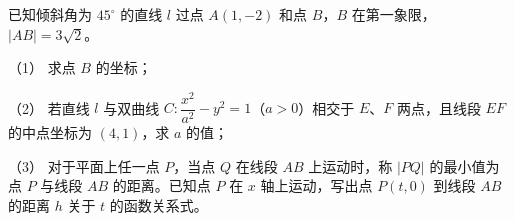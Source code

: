 \begin{question}
已知倾斜角为 $45^\circ$ 的直线 $l$ 过点 $A(1,-2)$ 和点 $B$，$B$ 在第一象限，$|AB|=3\sqrt{2}$。

（1） 求点 $B$ 的坐标；

（2） 若直线 $l$ 与双曲线 $C:\dfrac{x^2}{a^2}-y^2=1$（$a>0$）相交于 $E$、$F$ 两点，且线段 $EF$ 的中点坐标为 $(4,1)$，求 $a$ 的值；

（3） 对于平面上任一点 $P$，当点 $Q$ 在线段 $AB$ 上运动时，称 $|PQ|$ 的最小值为点 $P$ 与线段 $AB$ 的距离。已知点 $P$ 在 $x$ 轴上运动，写出点 $P(t,0)$ 到线段 $AB$ 的距离 $h$ 关于 $t$ 的函数关系式。

\end{question}